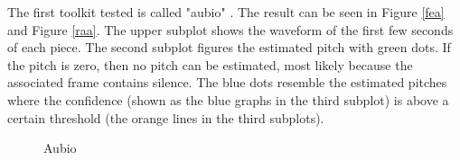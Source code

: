 The first toolkit tested is called "aubio" \cite{aubio1}. The result can be seen in Figure \ref{fea} and Figure \ref{raa}. The upper subplot shows the waveform of the first few seconds of each piece. The second subplot figures the estimated pitch with green dots. If the pitch is zero, then no pitch can be estimated, most likely because the associated frame contains silence. The blue dots resemble the estimated pitches where the confidence (shown as the blue graphs in the third subplot) is above a certain threshold (the orange lines in the third subplots).
\begin{figure}[htbp]
	\centering
	\caption{Aubio}
	\label{fig:aubio}
\end{figure}

